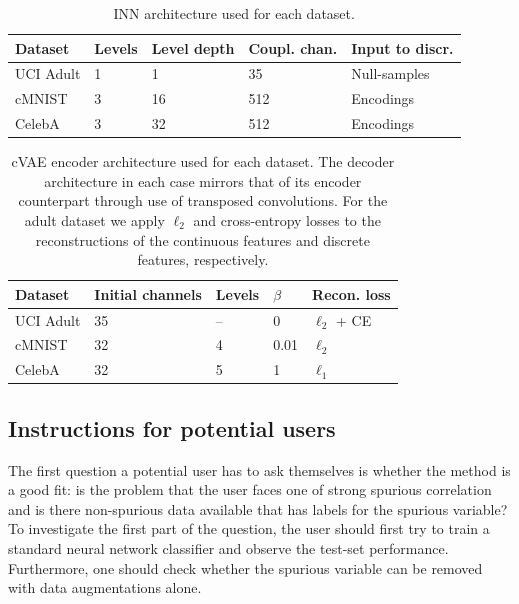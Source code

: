 \begin{table}[tp]
\caption{INN architecture used for each dataset.}
\label{tab:inn_architectures}
\centering
\begin{tabular}{lllll}
\toprule
Dataset & Levels & Level depth & Coupl. chan. & Input to discr. \\ \midrule
UCI Adult                   & 1      & 1     & 35       & Null-samples       \\
cMNIST                      & 3      & 16     & 512      & Encodings               \\
CelebA                      & 3      & 32     & 512      & Encodings        \\ \bottomrule
\end{tabular}
\end{table}

\begin{table}[tp]
\caption{cVAE encoder architecture used for each dataset. The decoder architecture in each case mirrors that of its encoder counterpart through use of transposed convolutions. For the adult dataset we apply $\ell_2$ and cross-entropy losses to the reconstructions of the continuous features and discrete features, respectively.}
\label{tab:vae_architectures}
\centering
\begin{tabular}{lllll}
\toprule
Dataset   & Initial channels & Levels & $\beta$ & Recon. loss \\
\midrule
UCI Adult & 35               & --     & 0       & $\ell_2$ + CE\\
cMNIST    & 32               & 4      & 0.01    & $\ell_2$ \\
CelebA    & 32               & 5      & 1       & $\ell_1$ \\ 
\bottomrule
\end{tabular}
\end{table}

\subsection{Instructions for potential users}
The first question a potential user has to ask themselves is
whether the method is a good fit:
is the problem that the user faces one of strong spurious correlation
and is there non-spurious data available that has labels for the spurious variable?
To investigate the first part of the question,
the user should first try to train a standard neural network classifier
and observe the test-set performance.
Furthermore, one should check
whether the spurious variable can be removed with data augmentations alone.

